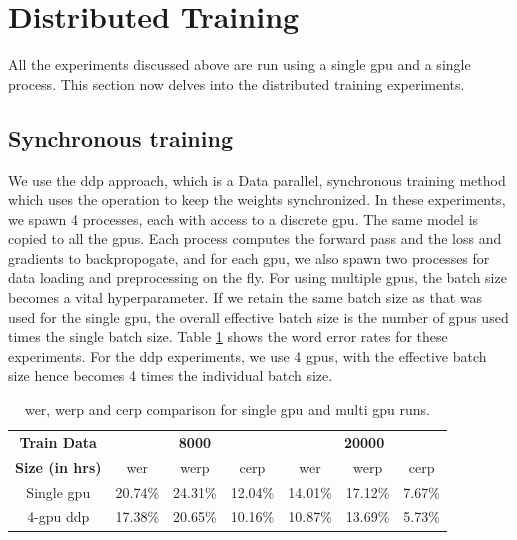 \section{Distributed Training}
\label{section:res_dist}
All the experiments discussed above are run using a single \acrshort{gpu} and a single process. This section now delves into the distributed training experiments. 

\subsection{Synchronous training}
We use the \acrfull{ddp} approach, which is a Data parallel, synchronous training method which uses the  operation to keep the weights synchronized. In these experiments, we spawn 4 processes, each with access to a discrete \acrshort{gpu}. The same model is copied to all the \acrshort{gpu}s. Each process computes the forward pass and the loss and gradients to backpropogate, and for each \acrshort{gpu}, we also spawn two processes for data loading and preprocessing on the fly. For using multiple \acrshort{gpu}s, the batch size becomes a vital hyperparameter. If we retain the same batch size as that was used for the single \acrshort{gpu}, the overall effective batch size is the number of \acrshort{gpu}s used times the single batch size. Table \ref{table:wer_ddp} shows the word error rates for these experiments. For the \acrshort{ddp} experiments, we use 4 \acrshort{gpu}s, with the effective batch size hence becomes 4 times the individual batch size. 

\begin{table}[ht]
\centering
\begin{tabular}{c | c c c | c c c }
\hline
\textbf{Train Data} & \multicolumn{3}{c|}{\textbf{8000}} & \multicolumn{3}{c}{\textbf{20000}}\\\cline{2-7}
   \textbf{Size (in hrs)} & \acrshort{wer} & \acrshort{werp} & \acrshort{cerp} & \acrshort{wer} & \acrshort{werp} & \acrshort{cerp}\\
 \hline
  Single \acrshort{gpu} & 20.74\% & 24.31\% & 12.04\% & 14.01\% & 17.12\% & 7.67\%\\
  4-\acrshort{gpu} \acrshort{ddp} & 17.38\% & 20.65\% & 10.16\% & 10.87\% & 13.69\% & 5.73\% \\
 \hline
\end{tabular}
\caption{\label{table:wer_ddp} \acrshort{wer}, \acrshort{werp} and \acrshort{cerp} comparison for single \acrshort{gpu} and multi \acrshort{gpu} runs.}
\end{table}

